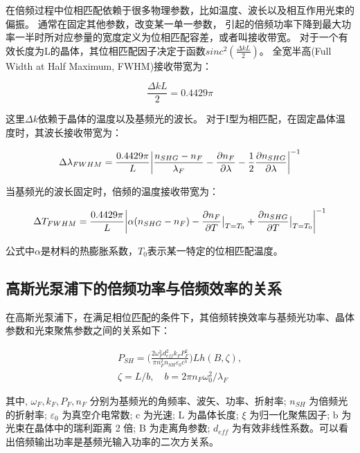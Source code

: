 \documentclass[a4paper,UTF8]{ctexart}
\begin{document}
在倍频过程中位相匹配依赖于很多物理参数，比如温度、波长以及相互作用光束的偏振。
通常在固定其他参数，改变某一单一参数，
引起的倍频功率下降到最大功率一半时所对应参量的宽度定义为位相匹配容差，或者叫接收带宽。
对于一个有效长度为L的晶体，其位相匹配因子决定于函数$sinc^{2}(\frac{\Delta k L}{2})$。
全宽半高(Full Width at Half Maximum, FWHM)接收带宽为：

\begin{equation}
    \frac{\Delta k L}{2} = 0.4429\pi
\end{equation}

这里$\Delta k$依赖于晶体的温度以及基频光的波长。
对于I型为相匹配，在固定晶体温度时，其波长接收带宽为：

\begin{equation}
    \Delta \lambda_{FWHM} = \frac{0.4429\pi}{L}\abs{\frac{n_{SHG}-n_{F}}{\lambda_F}- \frac{\partial n_F}{\partial \lambda} - \frac{1}{2}\frac{\partial n_{SHG}}{\partial \lambda}}^{-1}
\end{equation}

当基频光的波长固定时，倍频的温度接收带宽为：

\begin{equation}
    \Delta T_{FWHM} = \frac{0.4429\pi}{L}\abs{\alpha(n_{SHG}-n_{F})- \frac{\partial n_F}{\partial T}\big{|}_{T=T_0} + \frac{\partial n_{SHG}}{\partial T}\big{|}_{T=T_0}}^{-1}
\end{equation}

公式中$\alpha$是材料的热膨胀系数，$T_0$表示某一特定的位相匹配温度。

\subsection{高斯光泵浦下的倍频功率与倍频效率的关系}

在高斯光泵浦下，在满足相位匹配的条件下，其倍频转换效率与基频光功率、晶体参数和光束聚焦参数之间的关系如下：

\begin{align}
P_{SH}=\Bigg(\frac{2\omega_{F}^{2}d_{eff}^{2}k_{F}P_{F}^{2}}{\pi n_{F}^{2}n_{SH}\varepsilon_{0}c^{3}}\Bigg)Lh(B,\zeta), \\
\zeta=L/b,\quad b=2\pi n_F\omega_0^2/\lambda_F 
\end{align}

其中, $\omega_F, k_F, P_F, n_F$ 分别为基频光的角频率、波矢、功率、折射率; $n_{S H}$ 为倍频光的折射率; $\varepsilon_0$ 为真空介电常数; $\mathrm{c}$ 为光速; $\mathrm{L}$ 为晶体长度; $\xi$ 为归一化聚焦因子; $\mathrm{b}$ 为光束在晶体中的瑞利距离 2 倍; $\mathrm{B}$ 为走离角参数; $d_{e f f}$ 为有效非线性系数。可以看出倍频输出功率是基频光输入功率的二次方关系。
\end{document}

